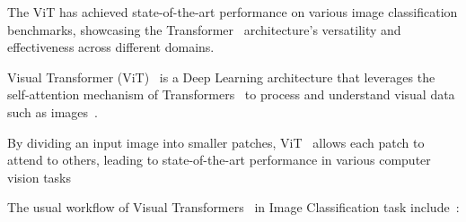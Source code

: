 \documentclass[12pt,a4paper]{report}
\begin{document}
The ViT has achieved state-of-the-art performance on various image classification benchmarks, showcasing the Transformer~\cite{vaswani2017attention} architecture's versatility and effectiveness across different domains.

Visual Transformer (ViT)~\cite{dosovitskiy2020} is a Deep Learning architecture that leverages the self-attention mechanism of Transformers~\cite{vaswani2017attention} to process and understand visual data such as images~\cite{vit}.

By dividing an input image into smaller patches, ViT~\cite{dosovitskiy2020} allows each patch to attend to others, leading to state-of-the-art performance in various computer vision tasks

The usual workflow of Visual Transformers~\cite{dosovitskiy2020} in Image Classification task include~\cite{vit}:
\end{document}
